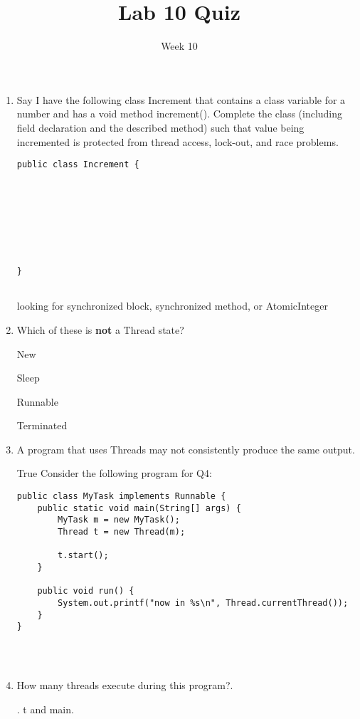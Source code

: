 \documentclass[addpoints]{exam}
\title{Lab 10 Quiz}
\date{Week 10}
\begin{document}
 

\Instructions

\begin{enumerate}
\vspace{2em}

\item
\question {} Say I have the following class Increment that contains a class variable for a number and has a void method increment(). Complete the class (including field declaration and the described method) such that value being incremented is protected from thread access, lock-out, and race problems. 

\newline
\begin{lstlisting}
public class Increment {
    
    
    
    
    
    
    
    
}


\end{lstlisting}
\Ans looking for synchronized block, synchronized method, or AtomicInteger
\newline

\newline
\item
\question {} Which of these is \textbf{not} a Thread state?

\begin{oneparchoices} 
\hspace{0.2cm}
 \choice New\newline
 
 \choice  Sleep \Ans \newline
 
 \choice Runnable \newline
 
 \choice Terminated \newline

\end{oneparchoices}


\item {} \tf  A program that uses Threads may not consistently produce the same output.
\vspace{1em}

\newline \Ans True
\newline
\newline
Consider the following program for Q4:

\begin{lstlisting}
public class MyTask implements Runnable {
    public static void main(String[] args) {
        MyTask m = new MyTask();
        Thread t = new Thread(m);
        
        t.start();
    }
    
    public void run() {
        System.out.printf("now in %s\n", Thread.currentThread());
    }
}




\end{lstlisting}
\item {} How many threads execute during this program?.

. t and main.


\vspace{2em}
\end{enumerate}
\end{document}

